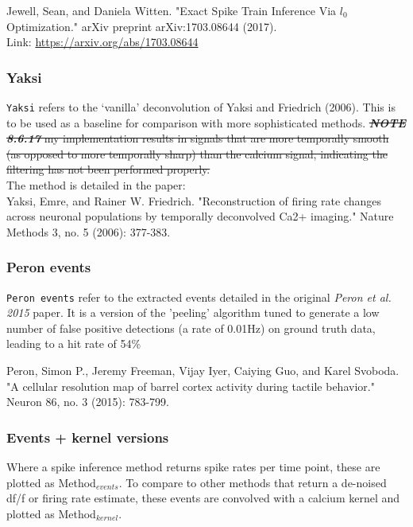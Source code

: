 \documentclass[a4paper,10pt,twocolumn]{article}
\begin{document}
\noindent Jewell, Sean, and Daniela Witten. "Exact Spike Train Inference Via $l_{0}$ Optimization." arXiv preprint arXiv:1703.08644 (2017).\\

\noindent Link: \href{https://arxiv.org/abs/1703.08644}{https://arxiv.org/abs/1703.08644}

\subsubsection*{Yaksi}
\texttt{Yaksi} refers to the `vanilla' deconvolution of Yaksi and Friedrich (2006). This is to be used as a baseline for comparison with more sophisticated methods. \st{\textbf{\emph{NOTE 8.6.17}} my implementation results in signals that are more temporally smooth (as opposed to more temporally sharp) than the calcium signal, indicating the filtering has not been performed properly.} \\

\noindent The method is detailed in the paper: \\
\noindent Yaksi, Emre, and Rainer W. Friedrich. "Reconstruction of firing rate changes across neuronal populations by temporally deconvolved Ca2+ imaging." Nature Methods 3, no. 5 (2006): 377-383.


\subsubsection*{Peron events}
\texttt{Peron events} refer to the extracted events detailed in the original \emph{Peron et al. 2015} paper. It is a version of the 'peeling' algorithm tuned to generate a low number of false positive detections (a rate of 0.01Hz) on ground truth data, leading to a hit rate of 54$\%$

\noindent Peron, Simon P., Jeremy Freeman, Vijay Iyer, Caiying Guo, and Karel Svoboda. "A cellular resolution map of barrel cortex activity during tactile behavior." Neuron 86, no. 3 (2015): 783-799.

\subsubsection*{Events + kernel versions}
Where a spike inference method returns spike rates per time point, these are plotted as Method$_{events}$. To compare to other methods that return a de-noised df/f or firing rate estimate, these events are convolved with a calcium kernel and plotted as Method$_{kernel}$.
\end{document}
